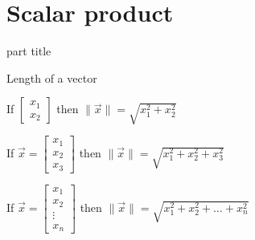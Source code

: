 \documentclass{beamer}
\begin{document}
\section{Scalar product}

\begin{frame}
  \begin{beamercolorbox}[sep=12pt,center]{part title}
    \insertsection\par
  \end{beamercolorbox}
\end{frame}

\begin{frame}{Length of a vector}
  \begin{definition}
    If $
      \left[
	\begin{array}{c}
          x_1\\
          x_2
	\end{array}
      \right]$
    then $\| \vec{x} \| = \sqrt{x_1^2+x_2^2}$
  \end{definition}
  \begin{definition}
    If $\vec{x}=
      \left[
	\begin{array}{c}
          x_1\\
          x_2\\
          x_3
	\end{array}
      \right]$
    then $\| \vec{x} \| = \sqrt{x_1^2+x_2^2+x_3^2}$
  \end{definition}
  \begin{definition}[n dimensions]
    If $\vec{x}=
      \left[
	\begin{array}{c}
          x_1\\
          x_2\\
          \vdots \\
          x_n
	\end{array}
      \right]$
    then $\| \vec{x} \| = \sqrt{x_1^2+x_2^2+\dots +x_n^2}$
  \end{definition}
\end{frame}
\end{document}
